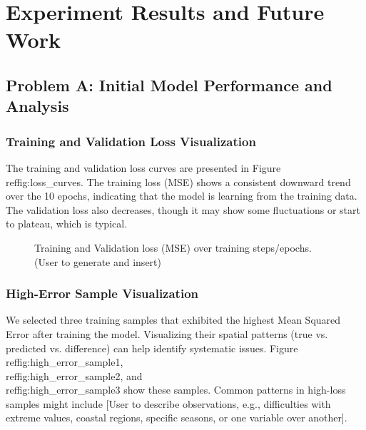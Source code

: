 \documentclass{article}
\begin{document}
\section{Experiment Results and Future Work}

\subsection{Problem A: Initial Model Performance and Analysis}

\subsubsection{Training and Validation Loss Visualization}
The training and validation loss curves are presented in Figure \\ref{fig:loss_curves}.
The training loss (MSE) shows a consistent downward trend over the 10 epochs, indicating that the model is learning from the training data. The validation loss also decreases, though it may show some fluctuations or start to plateau, which is typical.

\begin{figure}[h!]
  \centering
  \fbox{\rule[-.5cm]{0cm}{4cm} \rule[-.5cm]{8cm}{0cm}} %
  \caption{Training and Validation loss (MSE) over training steps/epochs. (User to generate and insert)}
  \label{fig:loss_curves}
\end{figure}

\subsubsection{High-Error Sample Visualization}
We selected three training samples that exhibited the highest Mean Squared Error after training the model. Visualizing their spatial patterns (true vs. predicted vs. difference) can help identify systematic issues. Figure \\ref{fig:high_error_sample1}, \\ref{fig:high_error_sample2}, and \\ref{fig:high_error_sample3} show these samples.
Common patterns in high-loss samples might include [User to describe observations, e.g., difficulties with extreme values, coastal regions, specific seasons, or one variable over another].
\end{document}
